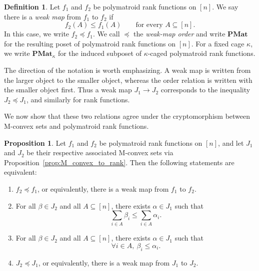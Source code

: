 \documentclass[11pt]{article}
\theoremstyle{definition}
\newtheorem{proposition}[theorem]{Proposition}
\newtheorem{definition}[theorem]{Definition}
\theoremstyle{remark}
\newcommand{\PMat}{\mathbf{PMat}}      %
\newcommand{\PMatK}{\mathbf{PMat}_\kappa}
\begin{document}
\begin{definition}\label{def:weak_map_order_rank}
    Let $f_1$ and $f_2$ be polymatroid rank functions on $[n]$. We say
    there is a \emph{weak map} from $f_1$ to $f_2$ if
    \[
        f_2(A)\leq f_1(A)
        \qquad\text{for every }A\subseteq[n].
    \]
    In this case, we write $f_2\preceq f_1$. We call $\preceq$ the
    \emph{weak-map order} and write $\PMat$ for the resulting poset of
    polymatroid rank functions on $[n]$. For a fixed cage $\kappa$, we write
    $\PMatK$ for the induced subposet of $\kappa$-caged polymatroid rank
    functions.
\end{definition}

The direction of the notation is worth emphasizing. A weak map is written
from the larger object to the smaller object, whereas the order relation is
written with the smaller object first. Thus a weak map $J_1\to J_2$
corresponds to the inequality $J_2\preceq J_1$, and similarly for rank
functions.

We now show that these two relations agree under the cryptomorphism between
M-convex sets and polymatroid rank functions.

\begin{proposition}\label{prop:equivalence_of_posets}
Let $f_1$ and $f_2$ be polymatroid rank functions on $[n]$, and let $J_1$
and $J_2$ be their respective associated M-convex sets via
Proposition~\ref{prop:M_convex_to_rank}. Then the following statements are
equivalent:
\begin{enumerate}
    \item[\textup{(1)}] $f_2\preceq f_1$, or equivalently, there is a weak
    map from $f_1$ to $f_2$.

    \item[\textup{(2)}] For all $\beta \in J_2$ and all
    $A \subseteq [n]$, there exists $\alpha \in J_1$ such that
    \[
        \sum_{i \in A} \beta_i \leq \sum_{i \in A} \alpha_i.
    \]

    \item[\textup{(3)}] For all $\beta \in J_2$ and all
    $A \subseteq [n]$, there exists $\alpha \in J_1$ such that
    \[
        \forall i \in A,\ \beta_i \leq \alpha_i.
    \]

    \item[\textup{(4)}] $J_2\preceq J_1$, or equivalently, there is a weak
    map from $J_1$ to $J_2$.
\end{enumerate}
\end{proposition}
\end{document}
